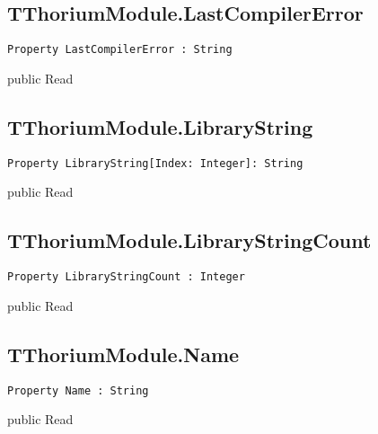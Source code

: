 \subsection{TThoriumModule.LastCompilerError}
\label{thoriumcore:thorium:tthoriummodule:lastcompilererror}
\begin{FPCList}
\Synopsis
\Declaration 

\begin{verbatim}
Property LastCompilerError : String
\end{verbatim}
\Visibility
public
\Access
Read
\Description
\end{FPCList}
\subsection{TThoriumModule.LibraryString}
\label{thoriumcore:thorium:tthoriummodule:librarystring}
\begin{FPCList}
\Synopsis
\Declaration 

\begin{verbatim}
Property LibraryString[Index: Integer]: String
\end{verbatim}
\Visibility
public
\Access
Read
\Description
\end{FPCList}
\subsection{TThoriumModule.LibraryStringCount}
\label{thoriumcore:thorium:tthoriummodule:librarystringcount}
\begin{FPCList}
\Synopsis
\Declaration 

\begin{verbatim}
Property LibraryStringCount : Integer
\end{verbatim}
\Visibility
public
\Access
Read
\Description
\end{FPCList}
\subsection{TThoriumModule.Name}
\label{thoriumcore:thorium:tthoriummodule:name}
\begin{FPCList}
\Synopsis
\Declaration 

\begin{verbatim}
Property Name : String
\end{verbatim}
\Visibility
public
\Access
Read
\Description
\end{FPCList}
